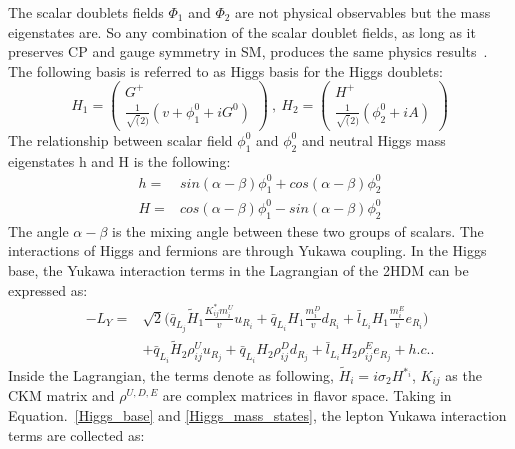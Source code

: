 The scalar doublets fields $\Phi_{1}$ and $\Phi_{2}$ are not physical observables but the mass eigenstates are. So any combination of the scalar doublet fields, as long as it preserves CP and gauge symmetry in SM, produces the same physics results~\cite{BRANCO20121}. The following basis is referred to as Higgs basis for the Higgs doublets:
\begin{equation}\label{Higgs_base}
H_{1}=
\begin{pmatrix}
G^{+}    \\
\frac{1}{\sqrt(2)}(v+\phi^{0}_{1}+iG^{0})
\end{pmatrix}~,~
H_{2}=
\begin{pmatrix}
H^{+}    \\
\frac{1}{\sqrt(2)}(\phi^{0}_{2}+iA)
\end{pmatrix}
\end{equation}
The relationship between scalar field $\phi_{1}^{0}$ and $\phi_{2}^{0}$ and neutral Higgs mass eigenstates h and H is the following:
\begin{equation}\label{Higgs_mass_states}
\begin{aligned}
h=&sin(\alpha-\beta)\phi_{1}^{0}+cos(\alpha-\beta)\phi_{2}^{0}\\
H=&cos(\alpha-\beta)\phi_{1}^{0}-sin(\alpha-\beta)\phi_{2}^{0}
\end{aligned}
\end{equation}
The angle $\alpha-\beta$ is the mixing angle between these two groups of scalars. The interactions of Higgs and fermions are through Yukawa coupling. In the Higgs base, the Yukawa interaction terms in the Lagrangian of the 2HDM can be expressed as:
\begin{equation}
\begin{aligned}
-L_{Y}=&\sqrt{2}\big(\bar{q}_{L_{j}}\tilde{H}_{1}\frac{K^{\ast}_{ij}m^{U}_{i}}{v}u_{R_{i}}+\bar{q}_{L_{i}}H_{1}\frac{m^{D}_{i}}{v}d_{R_{i}}+\bar{l}_{L_{i}}H_{1}\frac{m^{E}_{i}}{v}e_{R_{i}}\big) \\
            &+\bar{q}_{L_{i}}\tilde{H}_{2}\rho^{U}_{ij}u_{R_{j}}+\bar{q}_{L_{i}}H_{2}\rho^{D}_{ij}d_{R_{j}}+\bar{l}_{L_{i}}H_{2}\rho^{E}_{ij}e_{R_{j}}+h.c..
\end{aligned}
\end{equation}
Inside the Lagrangian, the terms denote as following, $\tilde{H}_i=i\sigma_{2}H^{\ast_{i}}$,  $K_{ij}$ as the CKM matrix and $\rho^{U,D,E}$ are complex matrices in flavor space. Taking in Equation.~\ref{Higgs_base} and \ref{Higgs_mass_states}, the lepton Yukawa interaction terms are collected as:
